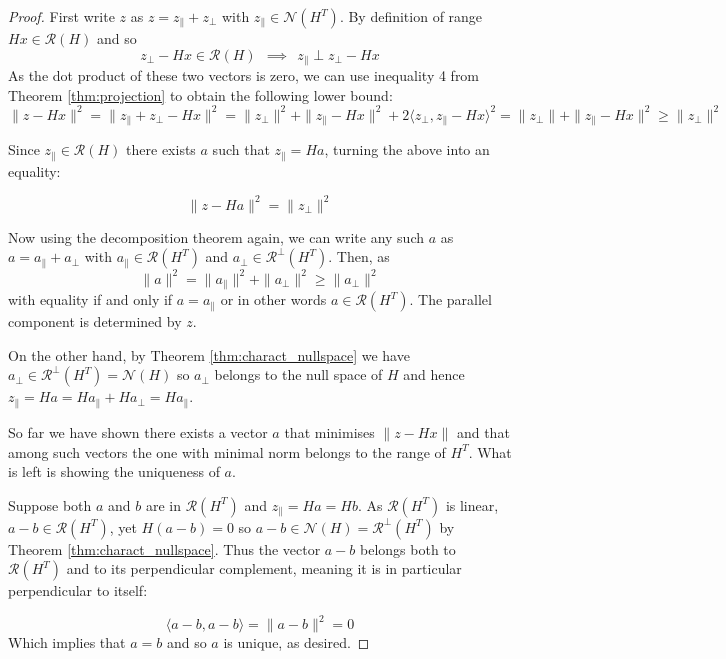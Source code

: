 \documentclass[a4paper]{article}
\theoremstyle{break}
\newcommand{\Nu}{\mathcal{N}}
\newcommand{\Ra}{\mathcal{R}}
\newcommand{\pll}{\parallel}
\begin{document}
\begin{proof}
    First write $z$ as $z = z_\pll + z_\perp$ with $z_\pll \in \Nu(H^T)$.
    By definition of range $H x \in \Ra(H)$ and so
    $$ z_\perp - H x \in \Ra(H) ~~ \implies ~~ z_\pll \perp z_\perp - H x $$
    As the dot product of these two vectors is zero, we can use inequality 4 from Theorem \ref{thm:projection} to obtain the following lower bound:
    \begin{equation}\label{eq:upper_bound}
    \| z - H x \|^2 = \| z_\pll + z_\perp - H x \|^2 =
    \| z_\perp \|^2 + \| z_\pll - H x \|^2 + 2 \langle z_\perp, z_\pll - H x \rangle^2 = 
    \| z_\perp \| + \| z_\pll - H x \|^2 \geq \| z_\perp \|^2        
    \end{equation}
    
    Since $ z_\pll \in \Ra(H)$ there exists $a$ such that $z_\pll = Ha$, turning the above into an equality:
    
    $$ \| z - Ha \|^2 = \| z_\perp \|^2$$
    
    Now using the decomposition theorem again, we can write any such $a$ as
    $ a = a_\pll + a_\perp $ with $a_\pll \in \Ra(H^T)$
    and $ a_\perp \in \Ra^\perp(H^T)$. Then, as 
    $$ \| a \|^2 = \| a_\pll \|^2 + \| a_\perp \|^2 \geq \| a_\perp\|^2$$
    with equality if and only if $a = a_\pll$ or in other words $ a \in \Ra(H^T)$. The parallel component is determined by $z$.

    On the other hand, by Theorem \ref{thm:charact_nullspace} we have $a_\perp \in \Ra^\perp (H^T) = \Nu(H)$ so $a_\perp$ belongs to the null space of $H$ and hence $ z_\pll = Ha = H a_\pll + H a_\perp = H a_\pll $.
    
    So far we have shown there exists a vector $a$ that minimises $ \| z - H x \| $ and that among such vectors the one with minimal norm belongs to the range of $ H^T $. What is left is showing the uniqueness of $a$.
    
    Suppose both $a$ and $b$ are in $ \Ra(H^T) $ and $ z_\pll = H a = H b$.
    As $ \Ra(H^T) $ is linear, $ a - b \in \Ra(H^T)$, yet $ H(a - b) = 0$ so $ a - b \in \Nu(H) = \Ra^\perp(H^T)$ by Theorem \ref{thm:charact_nullspace}. Thus the vector $ a - b$ belongs both to $ \Ra(H^T)$ and to its perpendicular complement, meaning it is in particular perpendicular to itself:
    
    $$ \langle a - b , a - b \rangle = \| a - b \|^2 = 0$$
    Which implies that $ a = b$ and so $a$ is unique, as desired.
\end{proof}
\end{document}
